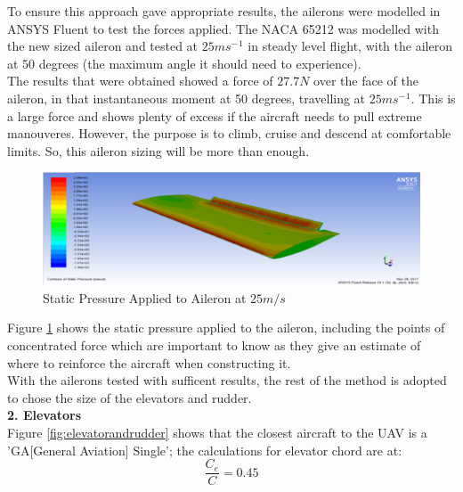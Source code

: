 \documentclass[12pt]{article}
\begin{document}
\noindent To ensure this approach gave appropriate results, the ailerons were modelled in ANSYS Fluent to test the forces applied. The NACA 65212 was modelled with the new sized aileron and tested at $25ms{{^-}^1}$ in steady level flight, with the aileron at 50 degrees (the maximum angle it should need to experience). \\

\noindent The results that were obtained showed a force of $27.7N$ over the face of the aileron, in that instantaneous moment at 50 degrees, travelling at $25ms{{^-}^1}$. This is a large force and shows plenty of excess if the aircraft needs to pull extreme manouveres. However, the purpose is to climb, cruise and descend at comfortable limits. So, this aileron sizing will be more than enough. 

\begin{figure}[H]
\includegraphics[width=18cm, scale=1]{aileroncfd.png}
\caption{Static Pressure Applied to Aileron at $25m/s$}
\label{fig:aileroncfd}
\end{figure}

\noindent Figure \ref{fig:aileroncfd} shows the static pressure applied to the aileron, including the points of concentrated force which are important to know as they give an estimate of where to reinforce the aircraft when constructing it. \\

\noindent With the ailerons tested with sufficent results, the rest of the method is adopted to chose the size of the elevators and rudder. \\

\noindent \textbf{2. Elevators} \\
\noindent Figure \ref{fig:elevatorandrudder} shows that the closest aircraft to the UAV is a 'GA[General Aviation] Single'; the calculations for elevator chord are at: \\

\begin{equation} \label{eq}
\frac{C_e}{C}=0.45
\end{equation}
\end{document}
